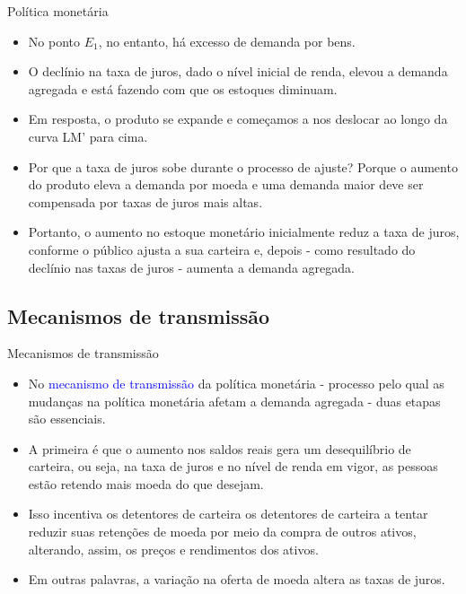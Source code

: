 \documentclass[10pt]{beamer}
\begin{document}
\begin{frame}{Política monetária}
\begin{itemize}
    \item No ponto $E_1$, no entanto, há excesso de demanda por bens.
    \bigskip
    \item O declínio na taxa de juros, dado o nível inicial de renda, elevou a demanda agregada e está fazendo com que os estoques diminuam.
    \bigskip
    \item Em resposta, o produto se expande e começamos a nos deslocar ao longo da curva LM' para cima.
    \bigskip
    \item Por que a taxa de juros sobe durante o processo de ajuste? Porque o aumento do produto eleva a demanda por moeda e uma demanda maior deve ser compensada por taxas de juros mais altas.
    \bigskip
    \item Portanto, o aumento no estoque monetário inicialmente reduz a taxa de juros, conforme o público ajusta a sua carteira e, depois - como resultado do declínio nas taxas de juros - aumenta a demanda agregada.
\end{itemize}
\end{frame}

\subsection{Mecanismos de transmissão}
\begin{frame}{Mecanismos de transmissão}
    \begin{itemize}
        \item No \textcolor{blue}{mecanismo de transmissão} da política monetária - processo pelo qual as mudanças na política monetária afetam a demanda agregada - duas etapas são essenciais.
        \bigskip
        \item A primeira é que o aumento nos saldos reais gera um desequilíbrio de carteira, ou seja, na taxa de juros e no nível de renda em vigor, as pessoas estão retendo mais moeda do que desejam.
        \bigskip
        \item Isso incentiva os detentores de carteira os detentores de carteira a tentar reduzir suas retenções de moeda por meio da compra de outros ativos, alterando, assim, os preços e rendimentos dos ativos.
        \bigskip
        \item Em outras palavras, a variação na oferta de moeda altera as taxas de juros.
    \end{itemize}
\end{frame}
\end{document}
